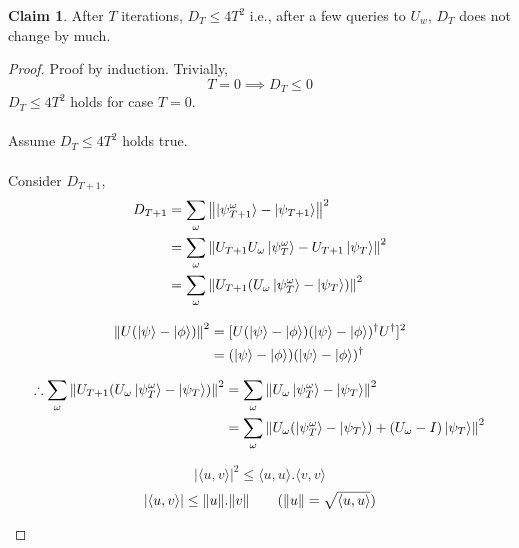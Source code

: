 \documentclass[11.5pt, paper=a4]{article}
\theoremstyle{definition}
\newtheorem{claim}{Claim}
\numberwithin{theorem}{section}
\begin{document}
\begin{claim}
After $T$ iterations, $D_T \le 4T^2$ i.e., after a few queries to $U_w$, $D_T$ does not change by much.
\end{claim}
\begin{proof}
Proof by induction. Trivially,
\begin{equation*}
    T = 0 \implies D_T \le 0
\end{equation*}
$D_T \le 4T^2$ holds for case $T = 0$.\\ \\
Assume $D_T \le 4T^2$ holds true.\\ \\
Consider $D_{T+1}$,
\begin{equation*}
\begin{split}
    D_{T+1} & = \sum_\omega\norm{\ket{\psi^\omega_{T+1}} - \ket{\psi_{T+1}}}^2\\
    & = \sum_\omega\norm{U_{T+1}U_\omega\ket{\psi^\omega_T}-U_{T+1}\ket{\psi_T}}^2\\
    & = \sum_\omega\norm{U_{T+1}(U_\omega\ket{\psi^\omega_T}-\ket{\psi_T})}^2\\
\end{split}
\end{equation*}

\begin{equation*}
\begin{split}
    \norm{U(\ket{\psi}-\ket{\phi})}^2 & = [U(\ket{\psi}-\ket{\phi})(\ket{\psi}-\ket{\phi})^\dagger U^\dagger]^2\\
    & = (\ket{\psi}-\ket{\phi})(\ket{\psi}-\ket{\phi})^\dagger\\
\end{split}
\end{equation*}

\begin{equation*}
\begin{split}
    \therefore \sum_\omega\norm{U_{T+1}(U_\omega\ket{\psi^\omega_T}-\ket{\psi_T})}^2 & = \sum_\omega\norm{U_\omega\ket{\psi^\omega_T}-\ket{\psi_T}}^2\\
    & = \sum_\omega\norm{U_\omega(\ket{\psi^\omega_T} - \ket{\psi_T}) + (U_\omega - I)\ket{\psi_T}}^2
\end{split}
\end{equation*}

\begin{boxthm}
\label{thm:cauchy_schwarz}
\begin{equation*}
    |\langle u,v\rangle|^2 \le \langle u,u\rangle.\langle v,v\rangle
\end{equation*}
\begin{equation*}
    |\langle u,v\rangle| \le \norm{u}.\norm{v} \tag{$\norm{u} = \sqrt{\langle u,u \rangle}$}
\end{equation*}
\end{boxthm}


\end{proof}
\end{document}
